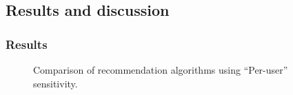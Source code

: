 \documentclass{beamer}
\begin{document}
\subsection{Results and discussion}
\begin{frame}
\frametitle{Results}
\begin{figure}[h]
  \begin{center}
  \end{center}
  \caption{Comparison of recommendation algorithms using ``Per-user'' sensitivity.}
\end{figure}
\end{frame}
\end{document}
